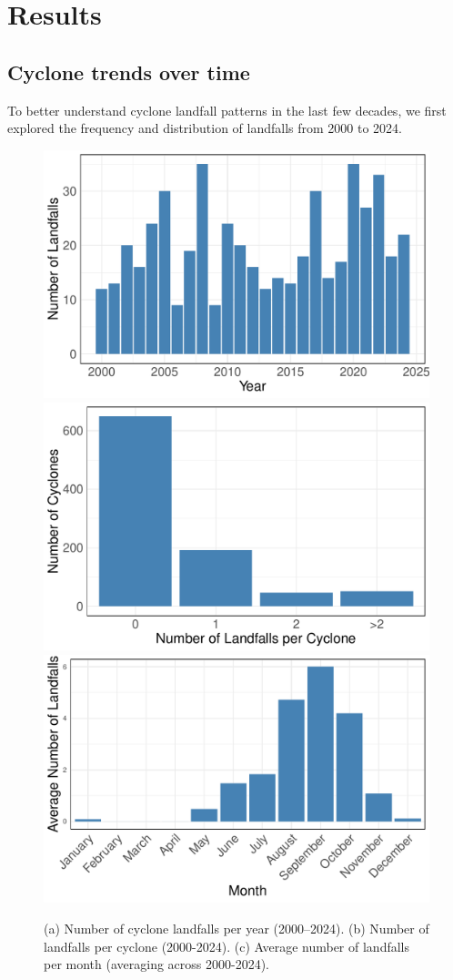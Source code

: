\documentclass[
]{article}
\begin{document}
\section{Results}\label{results}

\subsection{Cyclone trends over time}\label{cyclone-trends-over-time}

To better understand cyclone landfall patterns in the last few decades, we first explored the frequency and distribution of landfalls from 2000 to 2024.

\begin{figure}

{\centering \includegraphics[width=0.49\linewidth,height=1\textheight]{../outputs/eda-hurricane-data/landfalls-per-year} \includegraphics[width=0.49\linewidth,height=1\textheight]{../outputs/eda-hurricane-data/nbr-cyclone-landfalls} \includegraphics[width=0.49\linewidth,height=1\textheight]{../outputs/eda-hurricane-data/avg-landfalls-per-month} 

}

\caption{(a) Number of cyclone landfalls per year (2000–2024). (b) Number of landfalls per cyclone (2000-2024). (c) Average number of landfalls per month (averaging across 2000-2024).}\label{fig:figs1}
\end{figure}
\end{document}
